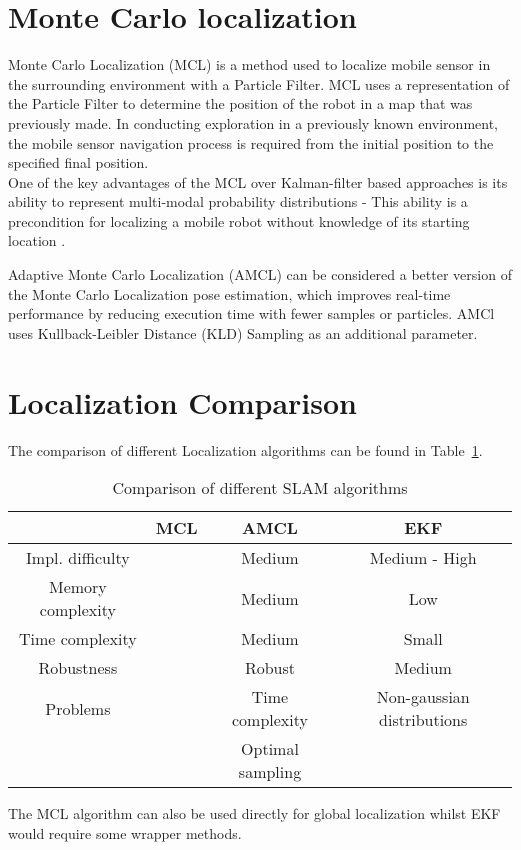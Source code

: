 \documentclass[12pt, a4paper, onecolumn]{article}
\begin{document}
\section{Monte Carlo localization}

Monte Carlo Localization (MCL) is a method used to localize mobile sensor in the surrounding environment with a Particle Filter. 
MCL uses a representation of the Particle Filter to determine the position of the robot in a map that was previously made.
In conducting exploration in a previously known environment, the mobile sensor navigation process is required from the initial position to the specified final position. \\

One of the key advantages of the MCL over Kalman-filter based approaches is its ability to represent multi-modal probability distributions - This ability is a precondition for localizing a mobile robot without knowledge of its starting location \cite{MCL99}.

Adaptive Monte Carlo Localization (AMCL) can be considered a better version of the Monte Carlo Localization pose estimation, which improves real-time performance by reducing execution time with fewer samples or particles. 
AMCl uses Kullback-Leibler Distance (KLD) Sampling as an additional parameter. \cite{AMCL19}

\section{Localization Comparison}
The comparison of different Localization algorithms can be found in Table~\ref{tab:slam_algorithms}.
\begin{table}[h!]
  \begin{center}
    \begin{tabular}[c]{|c | c c c |}
      \hline
                       & MCL   & AMCL          & EKF                 \\
      \hline
      Impl. difficulty &       & Medium        & Medium - High       \\
      \hline
      Memory complexity&       & Medium        & Low                 \\
      \hline
      Time complexity  &       & Medium        & Small               \\
      \hline
      Robustness       &       & Robust        & Medium              \\
      \hline
      Problems         &       & Time complexity & Non-gaussian distributions \\
                       &       & Optimal sampling &  \\
      \hline
    \end{tabular}
  \end{center}
  \caption{Comparison of different SLAM algorithms}
  \label{tab:slam_algorithms}
\end{table}
The MCL algorithm can also be used directly for global localization whilst EKF would require some wrapper methods.
\end{document}
